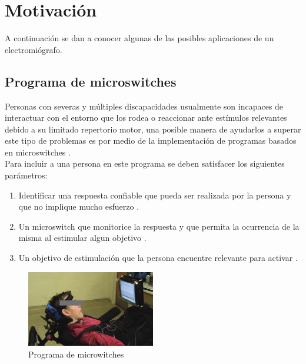 \chapter{Motivación}

A continuación se dan a conocer algunas de las posibles aplicaciones de un electromiógrafo. \\

\section{Programa de microswitches}

Personas con severas y múltiples discapacidades usualmente son incapaces de interactuar con el entorno que los rodea o reaccionar ante estímulos relevantes debido a su limitado repertorio motor, una posible manera de ayudarlos a superar este tipo de problemas es por medio de la implementación de programas basados en microswitches \cite{chau2016paediatric}. \\

Para incluir a una persona en este programa se deben satisfacer los siguientes parámetros:

\begin{enumerate}
	\item Identificar una respuesta confiable que pueda ser realizada por la persona y que no implique mucho esfuerzo \cite{chau2016paediatric}.
    \item Un microswitch que monitorice la respuesta y que permita la ocurrencia de la misma al estimular algun objetivo \cite{chau2016paediatric}.
    \item Un objetivo de estimulación que la persona encuentre relevante para activar \cite{chau2016paediatric}.
\end{enumerate}


\begin{figure}[h]
  \centering
  \includegraphics[width=0.5\textwidth]{Contexto/microswitch.jpg}
  \caption{Programa de microwitches \cite{chau2016paediatric}}
  \label{microswitch} 
\end{figure}

